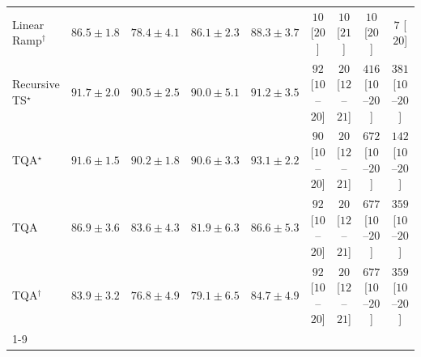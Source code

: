 \begin{tabular}{l|cccc|cccc|}
Linear Ramp$^\dagger$ & {\cellcolor[HTML]{0568A3}} \color[HTML]{F1F1F1} $86.5\pm 1.8$ & {\cellcolor[HTML]{4094C3}} \color[HTML]{F1F1F1} $78.4\pm 4.1$ & {\cellcolor[HTML]{056AA6}} \color[HTML]{F1F1F1} $86.1\pm 2.3$ & {\cellcolor[HTML]{046198}} \color[HTML]{F1F1F1} $88.3\pm 3.7$ & {\cellcolor[HTML]{FFF6F2}} \color[HTML]{000000} $10$ [$20$] & {\cellcolor[HTML]{FFF6F2}} \color[HTML]{000000} $10$ [$21$] & {\cellcolor[HTML]{FFF6F2}} \color[HTML]{000000} $10$ [$20$] & {\cellcolor[HTML]{FFF6F2}} \color[HTML]{000000} $7$ [$20$] \\
Recursive TS$^\star$ & {\cellcolor[HTML]{034E7B}} \color[HTML]{F1F1F1} $91.7\pm 2.0$ & {\cellcolor[HTML]{045687}} \color[HTML]{F1F1F1} $90.5\pm 2.5$ & {\cellcolor[HTML]{04598C}} \color[HTML]{F1F1F1} $90.0\pm 5.1$ & {\cellcolor[HTML]{045280}} \color[HTML]{F1F1F1} $91.2\pm 3.5$ & {\cellcolor[HTML]{FDE2DF}} \color[HTML]{000000} $92$ [$10$--$20$] & {\cellcolor[HTML]{FFF3F0}} \color[HTML]{000000} $20$ [$12$--$21$] & {\cellcolor[HTML]{F15C9F}} \color[HTML]{F1F1F1} $416$ [$10$--$20$] & {\cellcolor[HTML]{F76EA3}} \color[HTML]{F1F1F1} $381$ [$10$--$20$] \\
TQA$^\star$ & {\cellcolor[HTML]{034F7D}} \color[HTML]{F1F1F1} $91.6\pm 1.5$ & {\cellcolor[HTML]{04588A}} \color[HTML]{F1F1F1} $90.2\pm 1.8$ & {\cellcolor[HTML]{045687}} \color[HTML]{F1F1F1} $90.6\pm 3.3$ & {\cellcolor[HTML]{03466E}} \color[HTML]{F1F1F1} $93.1\pm 2.2$ & {\cellcolor[HTML]{FDE3E0}} \color[HTML]{000000} $90$ [$10$--$20$] & {\cellcolor[HTML]{FFF3F0}} \color[HTML]{000000} $20$ [$12$--$21$] & {\cellcolor[HTML]{810178}} \color[HTML]{F1F1F1} $672$ [$10$--$20$] & {\cellcolor[HTML]{FDD5D1}} \color[HTML]{000000} $142$ [$10$--$20$] \\
TQA & {\cellcolor[HTML]{0567A1}} \color[HTML]{F1F1F1} $86.9\pm 3.6$ & {\cellcolor[HTML]{0F76B3}} \color[HTML]{F1F1F1} $83.6\pm 4.3$ & {\cellcolor[HTML]{1E80B8}} \color[HTML]{F1F1F1} $81.9\pm 6.3$ & {\cellcolor[HTML]{0568A3}} \color[HTML]{F1F1F1} $86.6\pm 5.3$ & {\cellcolor[HTML]{FDE2DF}} \color[HTML]{000000} $92$ [$10$--$20$] & {\cellcolor[HTML]{FFF3F0}} \color[HTML]{000000} $20$ [$12$--$21$] & {\cellcolor[HTML]{7F0178}} \color[HTML]{F1F1F1} $677$ [$10$--$20$] & {\cellcolor[HTML]{F87CA8}} \color[HTML]{F1F1F1} $359$ [$10$--$20$] \\
TQA$^\dagger$ & {\cellcolor[HTML]{0C74B2}} \color[HTML]{F1F1F1} $83.9\pm 3.2$ & {\cellcolor[HTML]{549CC7}} \color[HTML]{F1F1F1} $76.8\pm 4.9$ & {\cellcolor[HTML]{3991C1}} \color[HTML]{F1F1F1} $79.1\pm 6.5$ & {\cellcolor[HTML]{056FAF}} \color[HTML]{F1F1F1} $84.7\pm 4.9$ & {\cellcolor[HTML]{FDE2DF}} \color[HTML]{000000} $92$ [$10$--$20$] & {\cellcolor[HTML]{FFF3F0}} \color[HTML]{000000} $20$ [$12$--$21$] & {\cellcolor[HTML]{7F0178}} \color[HTML]{F1F1F1} $677$ [$10$--$20$] & {\cellcolor[HTML]{F87CA8}} \color[HTML]{F1F1F1} $359$ [$10$--$20$] \\
\cline{1-9}
\bottomrule
\end{tabular}
